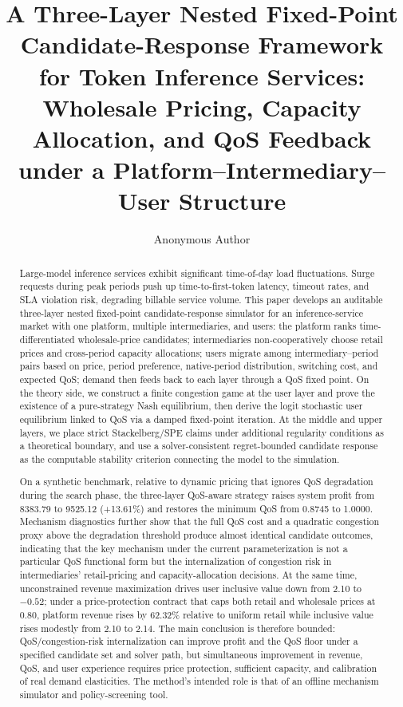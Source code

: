 \documentclass[11pt,a4paper]{article}
\title{\textbf{A Three-Layer Nested Fixed-Point Candidate-Response Framework for Token Inference Services:\\
Wholesale Pricing, Capacity Allocation, and QoS Feedback\\under a Platform--Intermediary--User Structure}}
\author{Anonymous Author}
\date{}
\begin{document}
\maketitle

\begin{abstract}
\noindent
Large-model inference services exhibit significant time-of-day load fluctuations. Surge requests during peak periods push up time-to-first-token latency, timeout rates, and SLA violation risk, degrading billable service volume. This paper develops an auditable three-layer nested fixed-point candidate-response simulator for an inference-service market with one platform, multiple intermediaries, and users: the platform ranks time-differentiated wholesale-price candidates; intermediaries non-cooperatively choose retail prices and cross-period capacity allocations; users migrate among intermediary--period pairs based on price, period preference, native-period distribution, switching cost, and expected QoS; demand then feeds back to each layer through a QoS fixed point. On the theory side, we construct a finite congestion game at the user layer and prove the existence of a pure-strategy Nash equilibrium, then derive the logit stochastic user equilibrium linked to QoS via a damped fixed-point iteration. At the middle and upper layers, we place strict Stackelberg/SPE claims under additional regularity conditions as a theoretical boundary, and use a solver-consistent regret-bounded candidate response as the computable stability criterion connecting the model to the simulation.

On a synthetic benchmark, relative to dynamic pricing that ignores QoS degradation during the search phase, the three-layer QoS-aware strategy raises system profit from 8383.79 to 9525.12 (+13.61\%) and restores the minimum QoS from 0.8745 to 1.0000. Mechanism diagnostics further show that the full QoS cost and a quadratic congestion proxy above the degradation threshold produce almost identical candidate outcomes, indicating that the key mechanism under the current parameterization is not a particular QoS functional form but the internalization of congestion risk in intermediaries' retail-pricing and capacity-allocation decisions. At the same time, unconstrained revenue maximization drives user inclusive value down from 2.10 to $-0.52$; under a price-protection contract that caps both retail and wholesale prices at 0.80, platform revenue rises by 62.32\% relative to uniform retail while inclusive value rises modestly from 2.10 to 2.14. The main conclusion is therefore bounded: QoS/congestion-risk internalization can improve profit and the QoS floor under a specified candidate set and solver path, but simultaneous improvement in revenue, QoS, and user experience requires price protection, sufficient capacity, and calibration of real demand elasticities. The method's intended role is that of an offline mechanism simulator and policy-screening tool.
\end{abstract}
\end{document}
